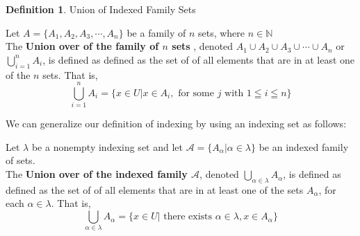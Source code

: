 \documentclass{book}
\theoremstyle{definition}
\newtheorem{definition}{Definition}[section]
\theoremstyle{remark}
\newcommand{\bb}[1]{\mathbb{#1}}
\begin{document}
\begin{definition}
Union of Indexed Family Sets \footnotemark \\
    \begin{tcolorbox}
    Let $A = \{A_1, A_2, A_3, \cdots, A_n  \}$ be a family of $n$ sets, where $n \in \bb{N}$ \\ 
    The \textbf{Union over of the family of $n$ sets} , denoted $A_1 \cup A_2 \cup A_3 \cup \cdots \cup A_n$ or $\bigcup_{i=1}^{n}{A_i}$, is defined as defined as the set of of all elements that are in at least one of the $n$ sets. That is,  
        \begin{equation*}
            \bigcup_{i=1}^{n}{A_i} = \{x \in U | x \in A_i, \text{ for some } j \text{ with } 1 \leqq i \leqq n \}
        \end{equation*}
\end{tcolorbox}
We can generalize our definition of indexing by using an indexing set as follows:

    \begin{tcolorbox}
    Let $\lambda$ be a nonempty indexing set and let $\mathcal{A} = \{ A_{\alpha} | \alpha \in \lambda \}$ be an indexed family of sets. \\ 
    The \textbf{Union over of the indexed family $\mathcal{A}$}, denoted $\bigcup_{\alpha \in \lambda}{A_{\alpha}}$, is defined as defined as the set of of all elements that are in at least one of the sets $A_{\alpha}$, for each $\alpha \in \lambda$. That is,  
        \begin{equation*}
            \bigcup_{\alpha \in \lambda}{A_{\alpha}} = \{x \in U | \text{ there exists } \alpha \in \lambda, x \in A_{\alpha} \}
        \end{equation*}
    \end{tcolorbox}
\end{definition}
\end{document}
